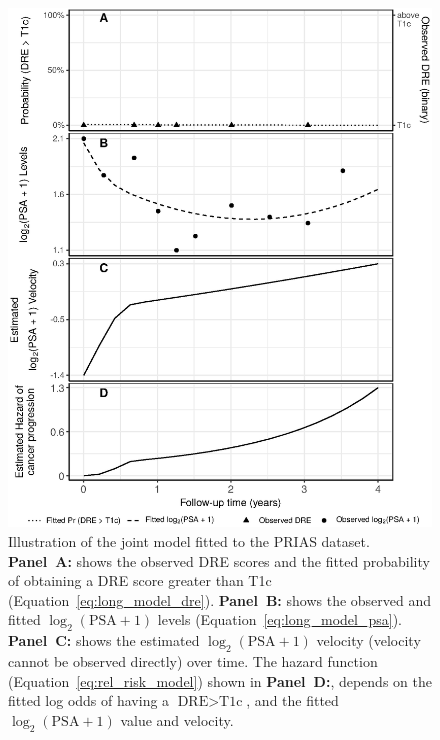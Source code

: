 \begin{figure}[!htb]
\captionsetup{justification=justified}
\centerline{\includegraphics[width=\columnwidth]{images/jmExplanationPlot_1757.eps}}
\caption{Illustration of the joint model fitted to the PRIAS dataset. \textbf{Panel~A:} shows the observed DRE scores and the fitted probability of obtaining a DRE score greater than T1c (Equation~\ref{eq:long_model_dre}). \textbf{Panel~B:} shows the observed and fitted $\log_2(\mbox{PSA} + 1)$ levels (Equation~\ref{eq:long_model_psa}). \textbf{Panel~C:} shows the estimated $\log_2(\mbox{PSA} + 1)$ velocity (velocity cannot be observed directly) over time. The hazard function (Equation~\ref{eq:rel_risk_model}) shown in \textbf{Panel~D:}, depends on the fitted log odds of having a $\mbox{DRE} > \mbox{T1c}$, and the fitted $\log_2(\mbox{PSA} + 1)$ value and velocity.}
\label{fig:jmExplanationPlot_1757}
\end{figure}

